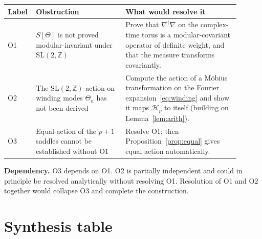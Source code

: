 \documentclass[12pt,a4paper]{article}
\theoremstyle{definition}
\theoremstyle{remark}
\newcommand{\SL}{\mathrm{SL}}
\newcommand{\ZZ}{\mathbb{Z}}
\newcommand{\Hp}{\mathcal{H}_p}
\begin{document}
\begin{center}
\renewcommand{\arraystretch}{1.4}
\begin{tabular}{@{}p{0.08\linewidth}p{0.36\linewidth}p{0.46\linewidth}@{}}
\toprule
Label & Obstruction & What would resolve it \\
\midrule
O1 & $S[\Theta]$ is not proved modular-invariant under $\SL(2,\ZZ)$ &
  Prove that $\nabla^\dagger\nabla$ on the complex-time torus is a
  modular-covariant operator of definite weight, and that the measure
  transforms covariantly. \\
\addlinespace
O2 & The $\SL(2,\ZZ)$-action on winding modes $\Theta_n$ has not been
  derived & Compute the action of a Möbius transformation on the Fourier
  expansion~\eqref{eq:winding} and show it maps $\Hp$ to itself
  (building on Lemma~\ref{lem:arith}). \\
\addlinespace
O3 & Equal-action of the $p+1$ saddles cannot be established without O1 &
  Resolve O1; then Proposition~\ref{prop:equal} gives equal action
  automatically. \\
\bottomrule
\end{tabular}
\end{center}

\begin{warnbox}
\textbf{Dependency.}  O3 depends on O1.  O2 is partially independent
and could in principle be resolved analytically without resolving O1.
Resolution of O1 and O2 together would collapse O3 and complete the
construction.
\end{warnbox}

\section{Synthesis table}
\label{sec:synthesis}
\end{document}
